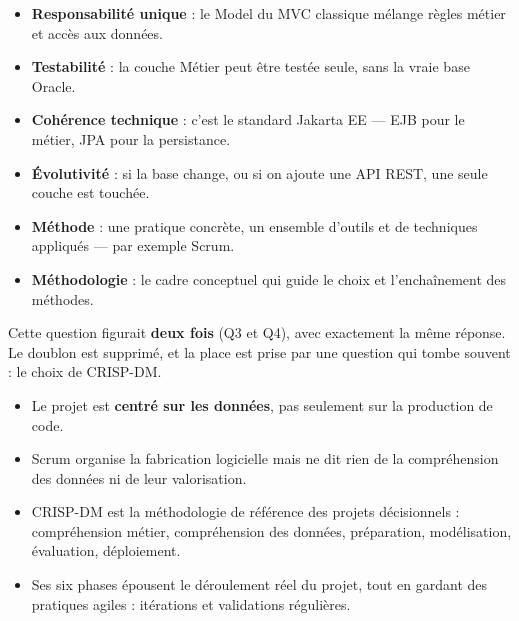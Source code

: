 \documentclass[a4paper,11pt]{article}
\begin{document}
\begin{itemize}[leftmargin=*,itemsep=1pt]
  \item \textbf{Responsabilité unique} : le Model du MVC classique mélange règles métier et accès aux données.
  \item \textbf{Testabilité} : la couche Métier peut être testée seule, sans la vraie base Oracle.
  \item \textbf{Cohérence technique} : c'est le standard Jakarta EE --- EJB pour le métier, JPA pour la persistance.
  \item \textbf{Évolutivité} : si la base change, ou si on ajoute une API REST, une seule couche est touchée.
\end{itemize}


\begin{itemize}[leftmargin=*,itemsep=1pt]
  \item \textbf{Méthode} : une pratique concrète, un ensemble d'outils et de techniques appliqués --- par exemple Scrum.
  \item \textbf{Méthodologie} : le cadre conceptuel qui guide le choix et l'enchaînement des méthodes.
\end{itemize}

\begin{corrige}
Cette question figurait \textbf{deux fois} (Q3 et Q4), avec exactement la même
réponse. Le doublon est supprimé, et la place est prise par une question qui
tombe souvent : le choix de CRISP-DM.
\end{corrige}


\begin{itemize}[leftmargin=*,itemsep=1pt]
  \item Le projet est \textbf{centré sur les données}, pas seulement sur la production de code.
  \item Scrum organise la fabrication logicielle mais ne dit rien de la compréhension des données ni de leur valorisation.
  \item CRISP-DM est la méthodologie de référence des projets décisionnels : compréhension métier, compréhension des données, préparation, modélisation, évaluation, déploiement.
  \item Ses six phases épousent le déroulement réel du projet, tout en gardant des pratiques agiles : itérations et validations régulières.
\end{itemize}
\end{document}
